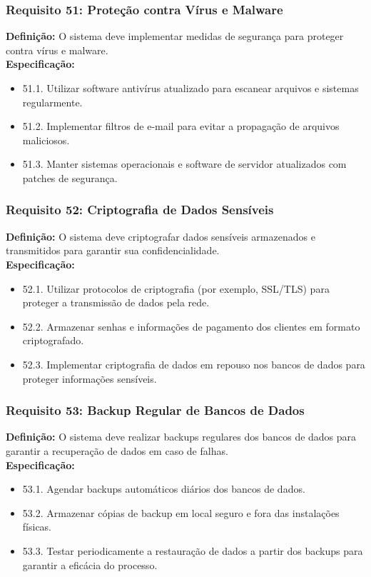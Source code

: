 \subsubsection{Requisito 51: Proteção contra Vírus e Malware}
\textbf{Definição:} O sistema deve implementar medidas de segurança para proteger contra vírus e malware.
\\
\textbf{Especificação:}
\begin{itemize}
	\item 51.1. Utilizar software antivírus atualizado para escanear arquivos e sistemas regularmente.
	\item 51.2. Implementar filtros de e-mail para evitar a propagação de arquivos maliciosos.
	\item 51.3. Manter sistemas operacionais e software de servidor atualizados com patches de segurança.
\end{itemize}

\subsubsection{Requisito 52: Criptografia de Dados Sensíveis}
\textbf{Definição:} O sistema deve criptografar dados sensíveis armazenados e transmitidos para garantir sua confidencialidade.
\\
\textbf{Especificação:}
\begin{itemize}
	\item 52.1. Utilizar protocolos de criptografia (por exemplo, SSL/TLS) para proteger a transmissão de dados pela rede.
	\item 52.2. Armazenar senhas e informações de pagamento dos clientes em formato criptografado.
	\item 52.3. Implementar criptografia de dados em repouso nos bancos de dados para proteger informações sensíveis.
\end{itemize}

\subsubsection{Requisito 53: Backup Regular de Bancos de Dados}
\textbf{Definição:} O sistema deve realizar backups regulares dos bancos de dados para garantir a recuperação de dados em caso de falhas.
\\
\textbf{Especificação:}
\begin{itemize}
	\item 53.1. Agendar backups automáticos diários dos bancos de dados.
	\item 53.2. Armazenar cópias de backup em local seguro e fora das instalações físicas.
	\item 53.3. Testar periodicamente a restauração de dados a partir dos backups para garantir a eficácia do processo.
\end{itemize}

